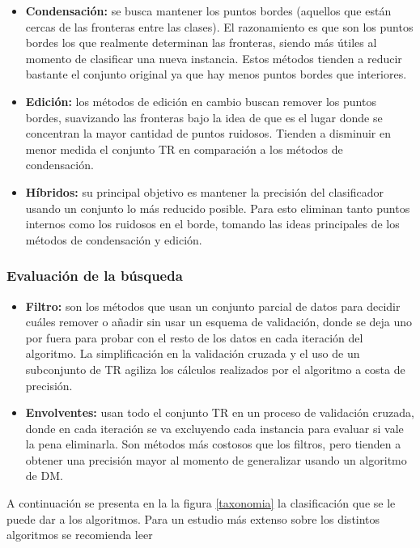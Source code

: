 \begin{itemize}
\item \textbf{Condensación:}
se busca mantener los puntos bordes (aquellos que están cercas de las fronteras entre las clases). El razonamiento es que son los puntos bordes los que realmente determinan las fronteras, siendo más útiles al momento de clasificar una nueva instancia. Estos métodos tienden a reducir bastante el conjunto original ya que hay menos puntos bordes que interiores.

\item \textbf{Edición:}
los métodos de edición en cambio buscan remover los puntos bordes, suavizando las fronteras bajo la idea de que es el lugar donde se concentran la mayor cantidad de puntos ruidosos. Tienden a disminuir en menor medida el conjunto TR en comparación a los métodos de condensación.

\item \textbf{Híbridos:}
su principal objetivo es mantener la precisión del clasificador usando un conjunto lo más reducido posible. Para esto eliminan tanto puntos internos como los ruidosos en el borde, tomando las ideas principales de los métodos de condensación y edición.
\end{itemize}

\subsubsection{Evaluación de la búsqueda}

\begin{itemize}
\item \textbf{Filtro:}
son los métodos que usan un conjunto parcial de datos para decidir cuáles remover o añadir sin usar un esquema de validación, donde se deja uno por fuera para probar con el resto de los datos en cada iteración del algoritmo. La simplificación en la validación cruzada y el uso de un subconjunto de TR agiliza los cálculos realizados por el algoritmo a costa de precisión.

\item \textbf{Envolventes:}
usan todo el conjunto TR en un proceso de validación cruzada, donde en cada iteración se va excluyendo cada instancia para evaluar si vale la pena eliminarla. Son métodos más costosos que los filtros, pero tienden a obtener una precisión mayor al momento de generalizar usando un algoritmo de DM.
\end{itemize}

A continuación se presenta en la la figura \ref{taxonomia} la clasificación que se le puede dar a los algoritmos. Para un estudio más extenso sobre los distintos algoritmos se recomienda leer \cite{garcia2016data}

